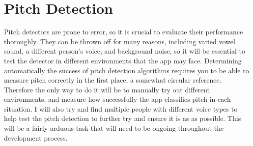 \section{Pitch Detection}
Pitch detectors are prone to error, so it is crucial to evaluate their performance thoroughly. They can be thrown off for many reasons, including varied vowel sound, a different person's voice, and background noise, so it will be essential to test the detector in different environments that the app may face. Determining automatically the success of pitch detection algorithms requires you to be able to measure pitch correctly in the first place, a somewhat circular reference. Therefore the only way to do it will be to manually try out different environments, and measure how successfully the app classifies pitch in each situation. I will also try and find multiple people with different voice types to help test the pitch detection to further try and ensure it is as  as possible. This will be a fairly arduous task that will need to be ongoing throughout the development process.